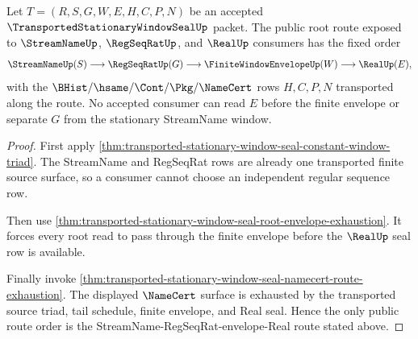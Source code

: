\begin{theorem}
\label{thm:transported-stationary-window-seal-streamname-regseqrat-real-route}
Let $T=(R,S,G,W,E,H,C,P,N)$ be an accepted $\TransportedStationaryWindowSealUp$ packet. The public root route exposed to $\StreamNameUp$, $\RegSeqRatUp$, and $\RealUp$ consumers has the fixed order
$$
\begin{aligned}
  \StreamNameUp(S)
  \longrightarrow
  \RegSeqRatUp(G)
  \longrightarrow
  \FiniteWindowEnvelopeUp(W)
  \longrightarrow
  \RealUp(E),
\end{aligned}
$$
with the $\BHist/\hsame/\Cont/\Pkg/\NameCert$ rows $H,C,P,N$ transported along the route. No accepted consumer can read $E$ before the finite envelope or separate $G$ from the stationary StreamName window.
\end{theorem}
\begin{proof}
First apply \autoref{thm:transported-stationary-window-seal-constant-window-triad}. The StreamName and RegSeqRat rows are already one transported finite source surface, so a consumer cannot choose an independent regular sequence row.

Then use \autoref{thm:transported-stationary-window-seal-root-envelope-exhaustion}. It forces every root read to pass through the finite envelope before the $\RealUp$ seal row is available.

Finally invoke \autoref{thm:transported-stationary-window-seal-namecert-route-exhaustion}. The displayed $\NameCert$ surface is exhausted by the transported source triad, tail schedule, finite envelope, and Real seal. Hence the only public route order is the StreamName-RegSeqRat-envelope-Real route stated above.
\end{proof}


